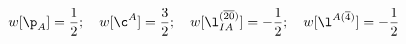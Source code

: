 \begin{equation}
\label{pesosx}w[\p_A]=\frac{1}{2};\quad w[\c^A]=\frac{3}{2};\quad
w[\l_{IA}^{(\overline{20})}]=-\frac{1}{2};\quad
w[\l^{A(\overline{4})}]=-\frac{1}{2}
\end{equation}

